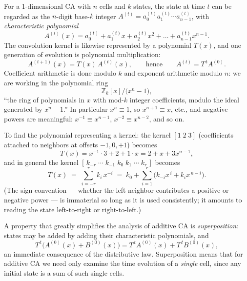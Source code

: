 For a 1-dimensional CA with $n$ cells and $k$ states, the state at time
$t$ can be regarded as the $n$-digit base-$k$ integer
$A^{(t)} = a^{(t)}_0 a^{(t)}_1 \cdots a^{(t)}_{n-1}$, with
\emph{characteristic polynomial}
\begin{equation}
  A^{(t)}(x) = a^{(t)}_0 + a^{(t)}_1 x + a^{(t)}_2 x^2 + \dots +
  a^{(t)}_{n-1}x^{n-1}.
\end{equation}
The convolution kernel is likewise represented by a polynomial $T(x)$,
and one generation of evolution is polynomial multiplication:
\begin{equation}
  A^{(t+1)}(x) = T(x)\,A^{(t)}(x),
  \qquad\text{hence}\qquad
  A^{(t)} = T^{\,t} A^{(0)}.
\end{equation}
Coefficient arithmetic is done modulo $k$ and exponent arithmetic
modulo $n$: we are working in the polynomial ring
\begin{equation}
  \mathbb{Z}_k[x]\big/\bigl(x^n - 1\bigr),
\end{equation}
``the ring of polynomials in $x$ with mod-$k$ integer coefficients,
modulo the ideal generated by $x^n-1$.''  In particular $x^n \equiv 1$,
so $x^{n+1}\equiv x$, etc., and negative powers are meaningful:
$x^{-1} \equiv x^{n-1}$, $x^{-2} \equiv x^{n-2}$, and so on.

To find the polynomial representing a kernel: the kernel $[1\;2\;3]$
(coefficients attached to neighbors at offsets $-1, 0, +1$) becomes
\begin{equation}
  T(x) = x^{-1}\!\cdot 3 + 2 + 1\cdot x
       = 2 + x + 3x^{n-1},
\end{equation}
and in general the kernel
$[\,k_{-r}\;\cdots\;k_{-1}\;k_0\;k_1\;\cdots\;k_r\,]$ becomes
\begin{equation}
  T(x) \;=\; \sum_{i=-r}^{r} k_i\, x^{-i}
  \;=\; k_0 + \sum_{i=1}^{r}\bigl(k_{-i}x^{\,i} + k_i x^{\,n-i}\bigr).
\end{equation}
(The sign convention --- whether the left neighbor contributes a
positive or negative power --- is immaterial so long as it is used
consistently; it amounts to reading the state left-to-right or
right-to-left.)

A property that greatly simplifies the analysis of additive CA is
\emph{superposition}: states may be added by adding their
characteristic polynomials, and
\begin{equation}
  T^{\,t}\bigl(A^{(0)}(x) + B^{(0)}(x)\bigr)
  = T^{\,t}A^{(0)}(x) + T^{\,t}B^{(0)}(x),
\end{equation}
an immediate consequence of the distributive law.  Superposition means
that for additive CA we need only examine the time evolution of a
\emph{single} cell, since any initial state is a sum of such single
cells.

